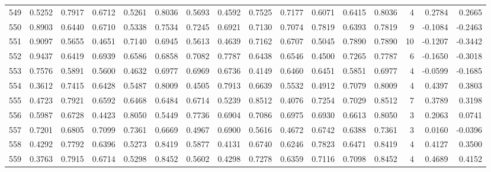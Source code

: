 \begin{tabular}{lrrrrrrrrrrrrrrr}
549 &      0.5252 &  0.7917 &  0.6712 &  0.5261 &  0.8036 &  0.5693 &  0.4592 &  0.7525 &  0.7177 &  0.6071 &   0.6415 &     0.8036 &      4 &                    0.2784 &                     0.2665 \\
550 &      0.8903 &  0.6440 &  0.6710 &  0.5338 &  0.7534 &  0.7245 &  0.6921 &  0.7130 &  0.7074 &  0.7819 &   0.6393 &     0.7819 &      9 &                   -0.1084 &                    -0.2463 \\
551 &      0.9097 &  0.5655 &  0.4651 &  0.7140 &  0.6945 &  0.5613 &  0.4639 &  0.7162 &  0.6707 &  0.5045 &   0.7890 &     0.7890 &     10 &                   -0.1207 &                    -0.3442 \\
552 &      0.9437 &  0.6419 &  0.6939 &  0.6586 &  0.6858 &  0.7082 &  0.7787 &  0.6438 &  0.6546 &  0.4500 &   0.7265 &     0.7787 &      6 &                   -0.1650 &                    -0.3018 \\
553 &      0.7576 &  0.5891 &  0.5600 &  0.4632 &  0.6977 &  0.6969 &  0.6736 &  0.4149 &  0.6460 &  0.6451 &   0.5851 &     0.6977 &      4 &                   -0.0599 &                    -0.1685 \\
554 &      0.3612 &  0.7415 &  0.6428 &  0.5487 &  0.8009 &  0.4505 &  0.7913 &  0.6639 &  0.5532 &  0.4912 &   0.7079 &     0.8009 &      4 &                    0.4397 &                     0.3803 \\
555 &      0.4723 &  0.7921 &  0.6592 &  0.6468 &  0.6484 &  0.6714 &  0.5239 &  0.8512 &  0.4076 &  0.7254 &   0.7029 &     0.8512 &      7 &                    0.3789 &                     0.3198 \\
556 &      0.5987 &  0.6728 &  0.4423 &  0.8050 &  0.5449 &  0.7736 &  0.6904 &  0.7086 &  0.6975 &  0.6930 &   0.6613 &     0.8050 &      3 &                    0.2063 &                     0.0741 \\
557 &      0.7201 &  0.6805 &  0.7099 &  0.7361 &  0.6669 &  0.4967 &  0.6900 &  0.5616 &  0.4672 &  0.6742 &   0.6388 &     0.7361 &      3 &                    0.0160 &                    -0.0396 \\
558 &      0.4292 &  0.7792 &  0.6396 &  0.5273 &  0.8419 &  0.5877 &  0.4131 &  0.6740 &  0.6246 &  0.7823 &   0.6471 &     0.8419 &      4 &                    0.4127 &                     0.3500 \\
559 &      0.3763 &  0.7915 &  0.6714 &  0.5298 &  0.8452 &  0.5602 &  0.4298 &  0.7278 &  0.6359 &  0.7116 &   0.7098 &     0.8452 &      4 &                    0.4689 &                     0.4152 \\

\end{tabular}
